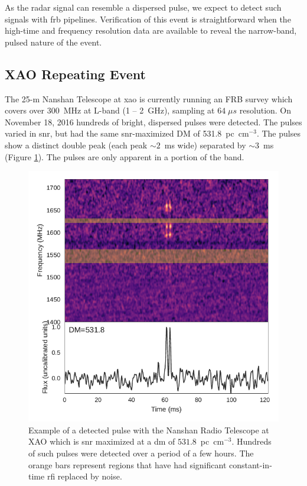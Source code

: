 \documentclass[a4paper,fleqn,usenatbib]{mnras}
\begin{document}
As the radar signal can resemble a dispersed pulse, we expect to detect such
signals with \gls{frb} pipelines.  Verification of this event is straightforward
when the high-time and frequency resolution data are available to reveal the
narrow-band, pulsed nature of the event.

\subsection{XAO Repeating Event}
\label{sec:xao_event}

The 25-m Nanshan Telescope at \gls{xao} is currently running an FRB survey which
covers over 300~MHz at L-band (1 -- 2~GHz), sampling at $64 \; \mu s$
resolution. On November 18, 2016 hundreds of bright, dispersed pulses were
detected. The pulses varied in \gls{snr}, but had the same \gls{snr}-maximized
DM of 531.8~pc~cm$^{-3}$. The pulses show a distinct double peak (each peak
$\sim 2$~ms wide) separated by $\sim 3$~ms (Figure \ref{fig:xao_dynamic}). The
pulses are only apparent in a portion of the band.

\begin{figure}
    \includegraphics[width=1.0\linewidth]{figures/XAO_pulse_dynamic.pdf}
    \caption{Example of a detected pulse with the Nanshan Radio Telescope at XAO
    which is \gls{snr} maximized at a \gls{dm} of $531.8$~pc~cm$^{-3}$.
    Hundreds of such pulses were detected over a period of a few hours. The
    orange bars represent regions that have had significant constant-in-time
    \gls{rfi} replaced by noise.
    }
    \label{fig:xao_dynamic}
\end{figure}
\end{document}
